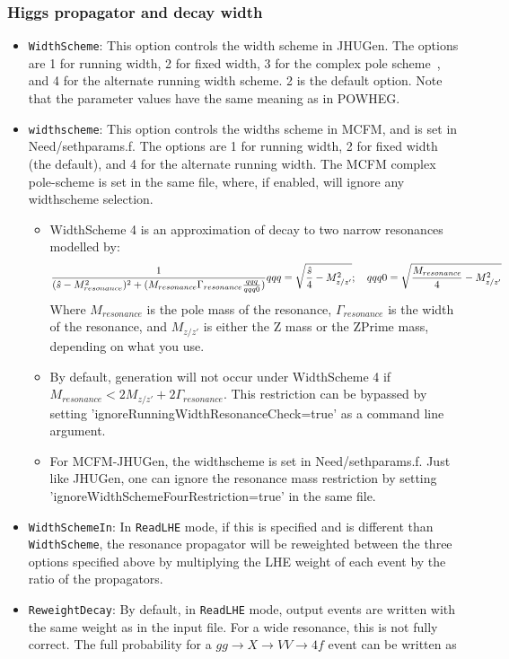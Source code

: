 \documentclass[aps,superscriptaddress,nofootinbib]{revtex4}
\begin{document}
\subsubsection{Higgs propagator and decay width}
\begin{itemize}
\item \verb|WidthScheme|: This option controls the width scheme in JHUGen. The options are 1 for running width, 2 for fixed width, 3 for the complex pole scheme~\cite{Passarino:2010qk,Goria:2011wa}, and 4 for the alternate running width scheme. 2 is the default option.  Note that the parameter values have the same meaning as in POWHEG.
\item \verb|widthscheme|: This option controls the widths scheme in MCFM, and is set in Need/sethparams.f. The options are 1 for running width, 2 for fixed width (the default), and 4 for the alternate running width. The MCFM complex pole-scheme is set in the same file, where, if enabled, will ignore any widthscheme selection.
\begin{itemize}
  \item WidthScheme 4 is an approximation of decay to two narrow resonances modelled by:
  \[
    \frac{1}{(\hat{s} - M_{resonance}^2)^2 + (M_{resonance}\Gamma_{resonance}\frac{qqq}{qqq0})}\\
    qqq=\sqrt{\frac{\hat{s}}{4} - M_{z/z'}^2}; \quad qqq0=\sqrt{\frac{M_{resonance}}{4} - M_{z/z'}^2}
  \]
  Where $M_{resonance}$ is the pole mass of the resonance, $\Gamma_{resonance}$ is the width of the resonance, and $M_{z/z'}$ is either the Z mass or the ZPrime mass, depending on what you use.
  \item By default, generation will not occur under WidthScheme 4 if $M_{resonance} < 2 M_{z/z'} + 2\Gamma_{resonance}$. This restriction can be bypassed by setting 'ignoreRunningWidthResonanceCheck=true' as a command line argument.
  \item For MCFM-JHUGen, the widthscheme is set in Need/sethparams.f. Just like JHUGen, one can ignore the resonance mass restriction by setting 'ignoreWidthSchemeFourRestriction=true' in the same file.
\end{itemize}
\item \verb|WidthSchemeIn|: In \verb|ReadLHE| mode, if this is specified and is different than \verb|WidthScheme|, the resonance propagator will be reweighted between the three options specified above by multiplying the LHE weight of each event by the ratio of the propagators.
\item \verb|ReweightDecay|: By default, in \verb|ReadLHE| mode, output events are written with the same weight as in the input file.  For a wide resonance, this is not fully correct.  The full probability for a $gg\to X\to VV\to 4f$ event can be written as

\end{itemize}
\end{document}
